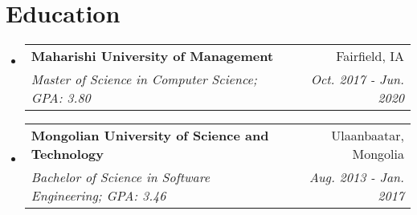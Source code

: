 \documentclass[letterpaper,11pt]{article}
\makeatletter
\newcommand{\resumeSubheading}[4]{
  \vspace{-1pt}\item
    \begin{tabular*}{0.97\textwidth}{l@{\extracolsep{\fill}}r}
      \textbf{#1} & #2 \\
      \textit{\small#3} & \textit{\small #4} \\
    \end{tabular*}\vspace{-5pt}
}
\newcommand{\resumeSubHeadingListStart}{\begin{itemize}[leftmargin=*]}
\newcommand{\resumeSubHeadingListEnd}{\end{itemize}}
\makeatother
\begin{document}
\section{Education}
  \resumeSubHeadingListStart
    \resumeSubheading
      {Maharishi University of Management}{Fairfield, IA}
      {Master of Science in Computer Science;  GPA: 3.80}{Oct. 2017 - Jun. 2020}

    \resumeSubheading
      {Mongolian University of Science and Technology}{Ulaanbaatar, Mongolia}
      {Bachelor of Science in Software Engineering;  GPA: 3.46}{Aug. 2013 - Jan. 2017}
  \resumeSubHeadingListEnd


\end{document}
